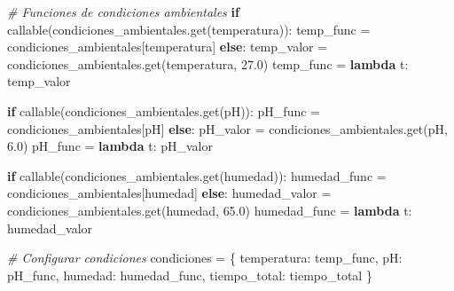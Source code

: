 \documentclass[
]{article}
\newenvironment{Shaded}{}{}
\newcommand{\BuiltInTok}[1]{\textcolor[rgb]{0.00,0.50,0.00}{#1}}
\newcommand{\CommentTok}[1]{\textcolor[rgb]{0.38,0.63,0.69}{\textit{#1}}}
\newcommand{\ControlFlowTok}[1]{\textcolor[rgb]{0.00,0.44,0.13}{\textbf{#1}}}
\newcommand{\FloatTok}[1]{\textcolor[rgb]{0.25,0.63,0.44}{#1}}
\newcommand{\KeywordTok}[1]{\textcolor[rgb]{0.00,0.44,0.13}{\textbf{#1}}}
\newcommand{\NormalTok}[1]{#1}
\newcommand{\OperatorTok}[1]{\textcolor[rgb]{0.40,0.40,0.40}{#1}}
\newcommand{\StringTok}[1]{\textcolor[rgb]{0.25,0.44,0.63}{#1}}
\begin{document}
\begin{Shaded}
\begin{Highlighting}[]
        \CommentTok{\# Funciones de condiciones ambientales}
        \ControlFlowTok{if} \BuiltInTok{callable}\NormalTok{(condiciones\_ambientales.get(}\StringTok{\textquotesingle{}temperatura\textquotesingle{}}\NormalTok{)):}
\NormalTok{            temp\_func }\OperatorTok{=}\NormalTok{ condiciones\_ambientales[}\StringTok{\textquotesingle{}temperatura\textquotesingle{}}\NormalTok{]}
        \ControlFlowTok{else}\NormalTok{:}
\NormalTok{            temp\_valor }\OperatorTok{=}\NormalTok{ condiciones\_ambientales.get(}\StringTok{\textquotesingle{}temperatura\textquotesingle{}}\NormalTok{, }\FloatTok{27.0}\NormalTok{)}
\NormalTok{            temp\_func }\OperatorTok{=} \KeywordTok{lambda}\NormalTok{ t: temp\_valor}
            
        \ControlFlowTok{if} \BuiltInTok{callable}\NormalTok{(condiciones\_ambientales.get(}\StringTok{\textquotesingle{}pH\textquotesingle{}}\NormalTok{)):}
\NormalTok{            pH\_func }\OperatorTok{=}\NormalTok{ condiciones\_ambientales[}\StringTok{\textquotesingle{}pH\textquotesingle{}}\NormalTok{]}
        \ControlFlowTok{else}\NormalTok{:}
\NormalTok{            pH\_valor }\OperatorTok{=}\NormalTok{ condiciones\_ambientales.get(}\StringTok{\textquotesingle{}pH\textquotesingle{}}\NormalTok{, }\FloatTok{6.0}\NormalTok{)}
\NormalTok{            pH\_func }\OperatorTok{=} \KeywordTok{lambda}\NormalTok{ t: pH\_valor}
            
        \ControlFlowTok{if} \BuiltInTok{callable}\NormalTok{(condiciones\_ambientales.get(}\StringTok{\textquotesingle{}humedad\textquotesingle{}}\NormalTok{)):}
\NormalTok{            humedad\_func }\OperatorTok{=}\NormalTok{ condiciones\_ambientales[}\StringTok{\textquotesingle{}humedad\textquotesingle{}}\NormalTok{]}
        \ControlFlowTok{else}\NormalTok{:}
\NormalTok{            humedad\_valor }\OperatorTok{=}\NormalTok{ condiciones\_ambientales.get(}\StringTok{\textquotesingle{}humedad\textquotesingle{}}\NormalTok{, }\FloatTok{65.0}\NormalTok{)}
\NormalTok{            humedad\_func }\OperatorTok{=} \KeywordTok{lambda}\NormalTok{ t: humedad\_valor}
        
        \CommentTok{\# Configurar condiciones}
\NormalTok{        condiciones }\OperatorTok{=}\NormalTok{ \{}
            \StringTok{\textquotesingle{}temperatura\textquotesingle{}}\NormalTok{: temp\_func,}
            \StringTok{\textquotesingle{}pH\textquotesingle{}}\NormalTok{: pH\_func,}
            \StringTok{\textquotesingle{}humedad\textquotesingle{}}\NormalTok{: humedad\_func,}
            \StringTok{\textquotesingle{}tiempo\_total\textquotesingle{}}\NormalTok{: tiempo\_total}
\NormalTok{        \}}
        

\end{Highlighting}
\end{Shaded}
\end{document}
